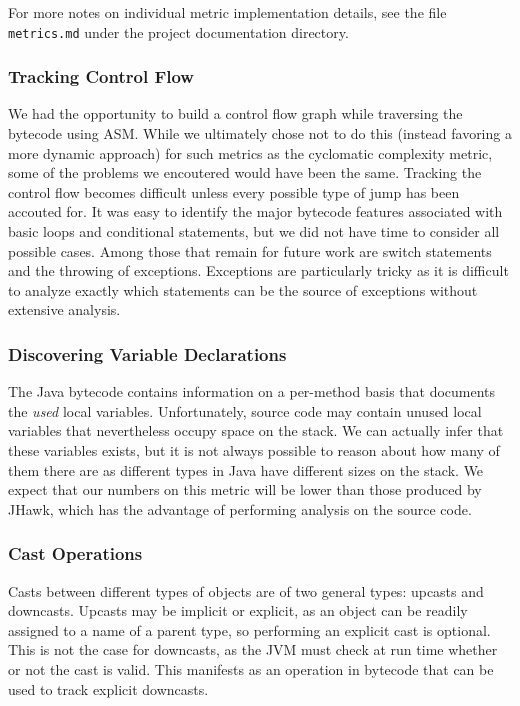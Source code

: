 For more notes on individual metric implementation details, see the file \texttt{metrics.md} under the \mt{} project documentation directory.

\subsubsection{Tracking Control Flow}

We had the opportunity to build a control flow graph while traversing the bytecode using ASM. While we ultimately chose not to do this (instead favoring a more dynamic approach) for such metrics as the cyclomatic complexity metric, some of the problems we encoutered would have been the same. Tracking the control flow becomes difficult unless every possible type of jump has been accouted for. It was easy to identify the major bytecode features associated with basic loops and conditional statements, but we did not have time to consider all possible cases. Among those that remain for future work are switch statements and the throwing of exceptions. Exceptions are particularly tricky as it is difficult to analyze exactly which statements can be the source of exceptions without extensive analysis.

\subsubsection{Discovering Variable Declarations}

The Java bytecode contains information on a per-method basis that documents the \textit{used} local variables. Unfortunately, source code may contain unused local variables that nevertheless occupy space on the stack. We can actually infer that these variables exists, but it is not always possible to reason about how many of them there are as different types in Java have different sizes on the stack. We expect that our numbers on this metric will be lower than those produced by JHawk, which has the advantage of performing analysis on the source code.

\subsubsection{Cast Operations}

Casts between different types of objects are of two general types: upcasts and downcasts. Upcasts may be implicit or explicit, as an object can be readily assigned to a name of a parent type, so performing an explicit cast is optional. This is not the case for downcasts, as the JVM must check at run time whether or not the cast is valid. This manifests as an operation in bytecode that can be used to track explicit downcasts.

